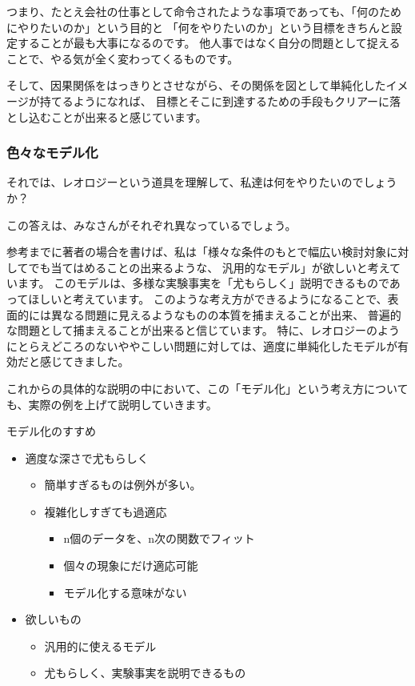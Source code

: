 \documentclass[uplatex,dvipdfmx,a4paper,11pt]{jsreport}
\begin{document}
つまり、たとえ会社の仕事として命令されたような事項であっても、「何のためにやりたいのか」という目的と
「何をやりたいのか」という目標をきちんと設定することが最も大事になるのです。
他人事ではなく自分の問題として捉えることで、やる気が全く変わってくるものです。

そして、因果関係をはっきりとさせながら、その関係を図として単純化したイメージが持てるようになれば、
目標とそこに到達するための手段もクリアーに落とし込むことが出来ると感じています。

\subsubsection{色々なモデル化}
それでは、レオロジーという道具を理解して、私達は何をやりたいのでしょうか？

この答えは、みなさんがそれぞれ異なっているでしょう。

参考までに著者の場合を書けば、私は「様々な条件のもとで幅広い検討対象に対してでも当てはめることの出来るような、
汎用的なモデル」が欲しいと考えています。
このモデルは、多様な実験事実を「尤もらしく」説明できるものであってほしいと考えています。
このような考え方ができるようになることで、表面的には異なる問題に見えるようなものの本質を捕まえることが出来、
普遍的な問題として捕まえることが出来ると信じています。
特に、レオロジーのようにとらえどころのないややこしい問題に対しては、適度に単純化したモデルが有効だと感じてきました。

これからの具体的な説明の中において、この「モデル化」という考え方についても、実際の例を上げて説明していきます。

\large
\begin{itembox}[l]{モデル化のすすめ}
	\begin{itemize}
		\item 適度な深さで尤もらしく
			\begin{itemize}
				\item 簡単すぎるものは例外が多い。
				\item 複雑化しすぎても過適応
				\begin{itemize}
					\item n個のデータを、n次の関数でフィット
					\item 個々の現象にだけ適応可能
					\item モデル化する意味がない
				\end{itemize}
			\end{itemize}
		\item 欲しいもの
		  \begin{itemize}
			\item 汎用的に使えるモデル
			\item 尤もらしく、実験事実を説明できるもの
		  \end{itemize}
		\end{itemize}
\end{itembox}
\normalsize
\end{document}
